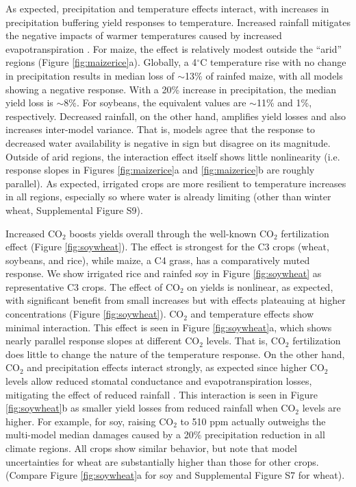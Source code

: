 \documentclass[gmd, manuscript]{copernicus} %
\begin{document}
As expected, precipitation and temperature effects interact, with increases in precipitation buffering yield responses to temperature. 
Increased rainfall mitigates the negative impacts of warmer temperatures caused by increased evapotranspiration \citep[e.g.][]{Allen1998}. 
For maize, the effect is relatively modest outside the ``arid'' regions (Figure \ref{fig:maizerice}a). 
Globally, a 4$^\circ$C temperature rise with no change in precipitation results in median loss of $\sim$13\% of rainfed maize, with all models showing a negative response.
With a 20\% increase in precipitation, the median yield loss is $\sim$8\%. 
For soybeans, the equivalent values are $\sim$11\% and 1\%, respectively. 
Decreased rainfall, on the other hand, amplifies yield losses and also increases inter-model variance. 
That is, models agree that the response to decreased water availability is negative in sign but disagree on its magnitude. 
Outside of arid regions, the interaction effect itself shows little nonlinearity (i.e. response slopes in Figures \ref{fig:maizerice}a and \ref{fig:maizerice}b are roughly parallel). 
As expected, irrigated crops are more resilient to temperature increases in all regions, especially so where water is already limiting (other than winter wheat, Supplemental Figure S9).

Increased CO$_2$ boosts yields overall through the well-known CO$_2$ fertilization effect (Figure \ref{fig:soywheat}). 
The effect is strongest for the C3 crops (wheat, soybeans, and rice), while maize, a C4 grass, has a comparatively muted response. 
We show irrigated rice and rainfed soy in Figure \ref{fig:soywheat} as representative C3 crops.  
The effect of CO$_2$ on yields is nonlinear, as expected, with significant benefit from small increases but with effects plateauing at higher concentrations (Figure \ref{fig:soywheat}). 
CO$_2$ and temperature effects show minimal interaction. 
This effect is seen in Figure \ref{fig:soywheat}a, which shows nearly parallel response slopes at different CO$_2$ levels. 
That is, CO$_2$ fertilization does little to change the nature of the temperature response. 
On the other hand, CO$_2$ and precipitation effects interact strongly, as expected since higher CO$_2$ levels allow reduced stomatal conductance and evapotranspiration losses, mitigating the effect of reduced rainfall \citep[e.g.][]{McGrath2013}. 
This interaction is seen in Figure \ref{fig:soywheat}b as smaller yield losses from reduced rainfall when CO$_2$ levels are higher. 
For example, for soy, raising CO$_2$ to 510 ppm actually outweighs the multi-model median damages caused by a 20\% precipitation reduction in all climate regions. 
All crops show similar behavior, but note that model uncertainties for wheat are substantially higher than those for other crops. 
(Compare Figure \ref{fig:soywheat}a for soy and Supplemental Figure S7 for wheat).
\end{document}
